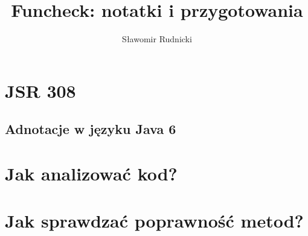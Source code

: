 \documentclass[12pt,a4paper,twoside]{article}
\author{Sławomir Rudnicki}
\title{Funcheck: notatki i przygotowania}
\begin{document}
\maketitle

\section{JSR 308}

\subsection{Adnotacje w języku Java 6}



\section{Jak analizować kod?}

\section{Jak sprawdzać poprawność metod?}
\end{document}
